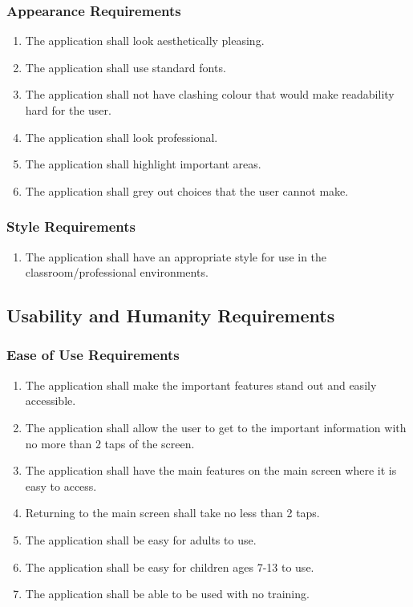 \documentclass[]{article}
\begin{document}
\subsubsection{Appearance Requirements}
\label{ssub:appearance_requirements}
\begin{enumerate}[{LF}1. ]
	\item The application shall look aesthetically pleasing.
	\item The application shall use standard fonts.
	\item The application shall not have clashing colour that would make
readability hard for the user.
	\item The application shall look professional.
	\item The application shall highlight important areas.
	\item The application shall grey out choices that the user cannot make.

\end{enumerate}

\subsubsection{Style Requirements}
\label{ssub:style_requirements}
\begin{enumerate}[{LF}1. ]
	\item The application shall have an appropriate style for use in the
classroom/professional environments.
\end{enumerate}


\subsection{Usability and Humanity Requirements}
\label{sub:usability_and_humanity_requirements}

\subsubsection{Ease of Use Requirements}
\label{ssub:ease_of_use_requirements}
\begin{enumerate}[{UH}1. ]
	\item The application shall make the important features stand out and easily
accessible.
	\item The application shall allow the user to get to the important information
with no more than 2 taps of the screen.
	\item The application shall have the main features on the main screen where it
is easy to access.
	\item Returning to the main screen shall take no less than 2 taps.
	\item The application shall be easy for adults to use.
	\item The application shall be easy for children ages 7-13 to use.
	\item The application shall be able to be used with no training.
\end{enumerate}
\end{document}
